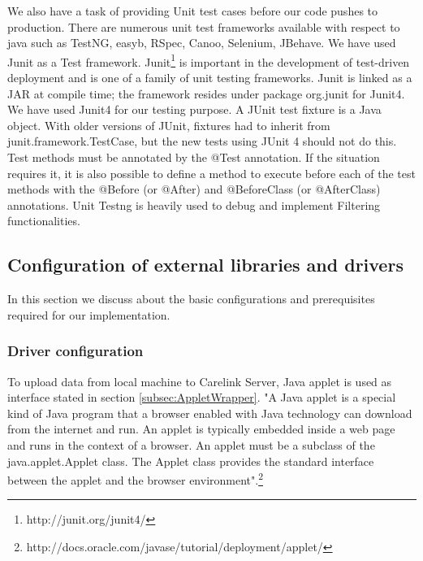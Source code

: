 \documentclass[article,type=msc,colorback,accentcolor=tud9c,twoside,11pt]{tudthesis}
\begin{document}
We also have a task of providing Unit test cases before our code pushes to production. There are numerous unit test frameworks available with respect to java such as TestNG, easyb, RSpec, Canoo, Selenium, JBehave. We have used Junit as a Test framework. Junit\footnote{http://junit.org/junit4/} is important in the development of test-driven deployment and is one of a family of unit testing frameworks. Junit is linked as a JAR at compile time; the framework resides under package org.junit for Junit4. We have used Junit4 for our testing purpose. A JUnit test fixture is a Java object. With older versions of JUnit, fixtures had to inherit from junit.framework.TestCase, but the new tests using JUnit 4 should not do this. Test methods must be annotated by the @Test annotation. If the situation requires it, it is also possible to define a method to execute before  each of the test methods with the @Before (or @After) and @BeforeClass (or @AfterClass) annotations. Unit Testng is heavily used to debug and implement Filtering functionalities.
\clearpage

\subsection{Configuration of external libraries and drivers}
In this section we discuss about the basic configurations and prerequisites required for our implementation.
\subsubsection{Driver configuration}
To upload data from local machine to Carelink Server, Java applet is  used as interface stated in section \ref{subsec:AppletWrapper}. "A Java applet is a special kind of Java program that a browser enabled with Java technology can download from the internet and run. An applet is typically embedded inside a web page and runs in the context of a browser. An applet must be a subclass of the java.applet.Applet class. The Applet class provides the standard interface between the applet and the browser environment".\footnote{http://docs.oracle.com/javase/tutorial/deployment/applet/}
\end{document}
